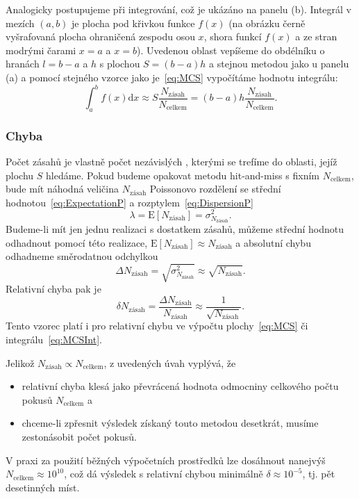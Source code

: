\documentclass[a4paper,11pt,twoside]{article}
\renewcommand{\d}{\mathrm{d}}
\def\expectation#1{\mathrm{E}\left[#1\right]}
\def\dispersion#1{\sigma_{#1}^{2}}
\theoremstyle{red}
\theoremstyle{green}
\begin{document}
        Analogicky postupujeme při integrování, což je ukázáno na panelu (b).
        Integrál v mezích $(a,b)$ je plocha pod křivkou funkce $f(x)$  (na obrázku černě vyšrafovaná plocha ohraničená zespodu osou $x$, shora funkcí $f(x)$ a ze stran modrými čarami $x=a$ a $x=b$).
        Uvedenou oblast vepíšeme do obdélníku o hranách $l=b-a$ a $h$ s plochou $S=(b-a)h$ a stejnou metodou jako u panelu (a) a pomocí stejného vzorce jako je~\eqref{eq:MCS} vypočítáme hodnotu integrálu:
        \begin{equation}
            \label{eq:MCSInt}
            \int_{a}^{b}f(x)\d x\approx S\frac{N_{\text{zásah}}}{N_{\text{celkem}}}=(b-a)h\frac{N_{\text{zásah}}}{N_{\text{celkem}}}.
        \end{equation}

        \subsubsection{Chyba}
            Počet zásahů je vlastně počet nezávislých , kterými se trefíme do oblasti, jejíž plochu $S$ hledáme.
            Pokud budeme opakovat metodu hit-and-miss s fixním $N_{\text{celkem}}$, bude mít náhodná veličina $N_{\text{zásah}}$ Poissonovo rozdělení se střední hodnotou~\eqref{eq:ExpectationP} a rozptylem~\eqref{eq:DispersionP}
            \begin{equation}
                \lambda=\expectation{N_{\text{zásah}}}=\dispersion{N_{\text{zásah}}}.
            \end{equation}
            Budeme-li mít jen jednu realizaci s dostatkem zásahů, můžeme střední hodnotu odhadnout pomocí této realizace, $\expectation{N_{\text{zásah}}}\approx N_{\text{zásah}}$ a absolutní chybu odhadneme směrodatnou odchylkou
            \begin{equation}
                \Delta N_{\text{zásah}}=\sqrt{\dispersion{N_\text{zásah}}}\approx\sqrt{N_{\text{zásah}}}.
            \end{equation}
            Relativní chyba pak je
            \begin{equation}
                \label{eq:MCRelative}
                \delta N_{\text{zásah}}=\frac{\Delta N_{\text{zásah}}}{N_{\text{zásah}}}\approx\frac{1}{\sqrt{N_{\text{zásah}}}}.
            \end{equation}
            Tento vzorec platí i pro relativní chybu ve výpočtu plochy~\eqref{eq:MCS} či integrálu~\eqref{eq:MCSInt}.

            Jelikož $N_{\text{zásah}}\propto N_{\text{celkem}}$, z uvedených úvah vyplývá, že
            \begin{itemize}
                \item relativní chyba klesá jako převrácená hodnota odmocniny celkového počtu pokusů $N_{\text{celkem}}$ a
                \item chceme-li zpřesnit výsledek získaný touto metodou desetkrát, musíme zestonásobit počet pokusů.
            \end{itemize}
            V praxi za použití běžných výpočetních prostředků lze dosáhnout nanejvýš $N_{\text{celkem}}\approx10^{10}$, což dá výsledek s relativní chybou minimálně $\delta\approx10^{-5}$, tj. pět desetinných míst.
\end{document}
